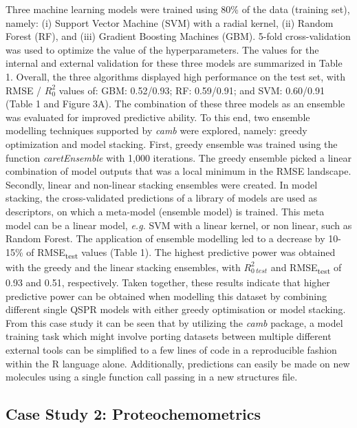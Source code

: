 \documentclass[twoside,a4wide,10pt]{article}
\begin{document}
Three machine learning models were trained using 80\% of the
data (training set), namely: 
(i) Support Vector Machine (SVM) with a radial kernel,
(ii) Random Forest (RF), and
(iii) Gradient Boosting Machines (GBM).
5-fold cross-validation was used to optimize the value of the hyperparameters.
The values for the internal and external validation for these three models are summarized in Table 1.
Overall, the three algorithms displayed high performance on the test set,
with RMSE / $R^{2}_{0}$ values of:  GBM: 0.52/0.93; RF: 0.59/0.91; and SVM: 0.60/0.91  (Table 1 and Figure 3A). 
The combination of these three models as an ensemble was evaluated for improved predictive ability.
To this end, two ensemble modelling techniques supported by {\it camb} were explored,
namely: greedy optimization and model stacking.
First, greedy ensemble was trained using the function {\it caretEnsemble} with 1,000 iterations. 
The greedy ensemble picked a linear combination of model outputs that was a local minimum in the RMSE landscape. 
Secondly, linear and non-linear stacking ensembles were created.
In model stacking, the cross-validated predictions of a library of models are used as descriptors,
on which a meta-model (ensemble model) is trained.
This meta model can be a linear model, {\it e.g.} SVM with a linear kernel,
or non linear, such as Random Forest.
The application of ensemble modelling led to a decrease by 10-15\%
of RMSE\textsubscript{test} values (Table 1).
The highest predictive power was obtained with the greedy and the linear stacking ensembles,
with $R^{2}_{0\ test}$ and RMSE\textsubscript{test} of 0.93 and 0.51, respectively.
Taken together, these results indicate that higher predictive power can be obtained when modelling this dataset
by combining different single QSPR models with either greedy optimisation or model stacking.
From this case study it can be seen that by utilizing the \textit{camb} package, a model training task which might involve
porting datasets between multiple different external tools can be simplified to a few lines of code in a reproducible fashion within the R language alone. Additionally, predictions can easily be made on new molecules using a single function call passing in a new structures file.

\subsection{Case Study 2: Proteochemometrics}
\end{document}
